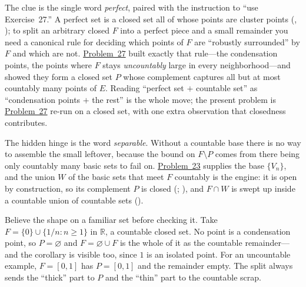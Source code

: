 \documentclass[main.tex]{subfiles}
\begin{document}
\begin{Reflection}
The clue is the single word \emph{perfect}, paired with the instruction to ``use Exercise~27.'' A perfect
set is a closed set all of whose points are cluster points (, ); to split an
arbitrary closed $F$ into a perfect piece and a small remainder you need a canonical rule for deciding
which points of $F$ are ``robustly surrounded'' by $F$ and which are not. \hyperlink{prob:27}{Problem~27}
built exactly that rule---the condensation points, the points where $F$ stays \emph{uncountably} large in
every neighborhood---and showed they form a closed set $P$ whose complement captures all but at most
countably many points of $E$. Reading ``perfect set $+$ countable set'' as ``condensation points $+$ the
rest'' is the whole move; the present problem is \hyperlink{prob:27}{Problem~27} re-run on a closed set,
with one extra observation that closedness contributes.

The hidden hinge is the word \emph{separable}. Without a countable base there is no way to assemble the
small leftover, because the bound on $F\setminus P$ comes from there being only countably many basic sets
to fail on. \hyperlink{prob:23}{Problem~23} supplies the base $\{V_n\}$, and the union $W$ of the basic
sets that meet $F$ countably is the engine: it is open by construction, so its complement $P$ is closed
(; ), and $F\cap W$ is swept up inside a countable
union of countable sets ().

Believe the shape on a familiar set before checking it. Take $F=\{0\}\cup\{1/n:n\ge 1\}$ in $\mathbb R$, a
countable closed set. No point is a condensation point, so $P=\varnothing$ and $F=\varnothing\cup F$ is
the whole of it as the countable remainder---and the corollary is visible too, since $1$ is an isolated
point. For an uncountable example, $F=[0,1]$ has $P=[0,1]$ and the remainder empty. The split always sends
the ``thick'' part to $P$ and the ``thin'' part to the countable scrap.


\end{Reflection}
\end{document}
